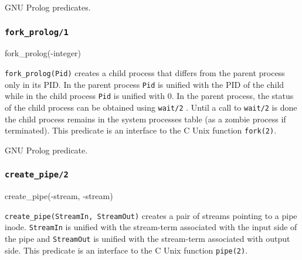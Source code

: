 \Portability

GNU Prolog predicates.

\subsubsection{\texttt{fork\_prolog/1}}

\begin{TemplatesOneCol}
fork\_prolog(-integer)

\end{TemplatesOneCol}

\Description

\texttt{fork\_prolog(Pid)} creates a child process that differs from the parent
process only in its PID. In the parent process \texttt{Pid} is unified with
the PID of the child while in the child process \texttt{Pid} is unified with
0. In the parent process, the status of the child process can be obtained
using \texttt{wait/2} . Until a call to \texttt{wait/2} is done
the child process remains in the system processes table (as a zombie process
if terminated). This predicate is an interface to the C Unix function
\texttt{fork(2)}.

\begin{PlErrors}



\end{PlErrors}

\Portability

GNU Prolog predicate.

\subsubsection{\texttt{create\_pipe/2}}

\begin{TemplatesOneCol}
create\_pipe(-stream, -stream)

\end{TemplatesOneCol}

\Description

\texttt{create\_pipe(StreamIn, StreamOut)} creates  a  pair  of streams
pointing to a pipe inode. \texttt{StreamIn} is unified with the stream-term
associated with the input side of the pipe and \texttt{StreamOut} is unified
with the stream-term associated with output side. This predicate is an
interface to the C Unix function \texttt{pipe(2)}.

